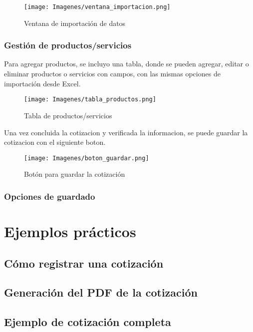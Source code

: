 \documentclass{Pretexto/bluereport}
\begin{document}
\begin{figure}[H]
    \centering
    \texttt{[image: Imagenes/ventana\_importacion.png]}
    \caption{Ventana de importación de datos}
    \label{fig:ventana_importacion}
\end{figure}


\subsubsection{Gestión de productos/servicios}

Para agregar productos, se incluyo una tabla, donde se pueden agregar, editar o eliminar productos o servicios con campos, con las mismas opciones de importación desde Excel.

\begin{figure}[H]
    \centering
    \texttt{[image: Imagenes/tabla\_productos.png]}
    \caption{Tabla de productos/servicios}
    \label{fig:tabla_productos} 
\end{figure}

Una vez concluida la cotizacion y verificada la informacion, se puede guardar la cotizacion con el siguiente boton.

\begin{figure}[H]
    \centering
    \texttt{[image: Imagenes/boton\_guardar.png]}
    \caption{Botón para guardar la cotización}
    \label{fig:boton_guardar}
\end{figure}

\subsubsection{Opciones de guardado}

\section{Ejemplos prácticos}
\subsection{Cómo registrar una cotización}
\subsection{Generación del PDF de la cotización}
\subsection{Ejemplo de cotización completa}
\end{document}
